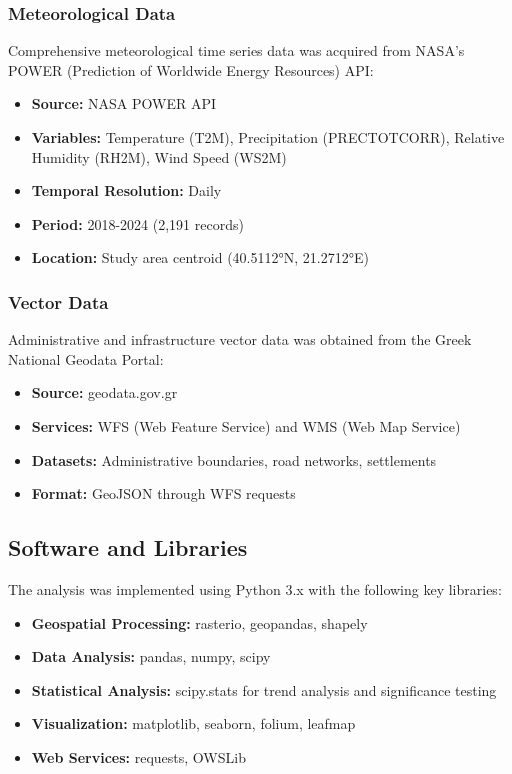 \documentclass[a4paper,12pt]{article}
\begin{document}
\subsubsection{Meteorological Data}

Comprehensive meteorological time series data was acquired from NASA's POWER (Prediction of
Worldwide Energy Resources) API:

\begin{itemize}
    \item \textbf{Source:} NASA POWER API
    \item \textbf{Variables:} Temperature (T2M), Precipitation (PRECTOTCORR), Relative Humidity (RH2M), Wind Speed (WS2M)
    \item \textbf{Temporal Resolution:} Daily
    \item \textbf{Period:} 2018-2024 (2,191 records)
    \item \textbf{Location:} Study area centroid (40.5112°N, 21.2712°E)
\end{itemize}

\subsubsection{Vector Data}

Administrative and infrastructure vector data was obtained from the Greek
National Geodata Portal:

\begin{itemize}
    \item \textbf{Source:} geodata.gov.gr
    \item \textbf{Services:} WFS (Web Feature Service) and WMS (Web Map Service)
    \item \textbf{Datasets:} Administrative boundaries, road networks, settlements
    \item \textbf{Format:} GeoJSON through WFS requests
\end{itemize}

\subsection{Software and Libraries}

The analysis was implemented using Python 3.x with the following key libraries:

\begin{itemize}
    \item \textbf{Geospatial Processing:} rasterio, geopandas, shapely
    \item \textbf{Data Analysis:} pandas, numpy, scipy
    \item \textbf{Statistical Analysis:} scipy.stats for trend analysis and significance testing
    \item \textbf{Visualization:} matplotlib, seaborn, folium, leafmap
    \item \textbf{Web Services:} requests, OWSLib
\end{itemize}
\end{document}
